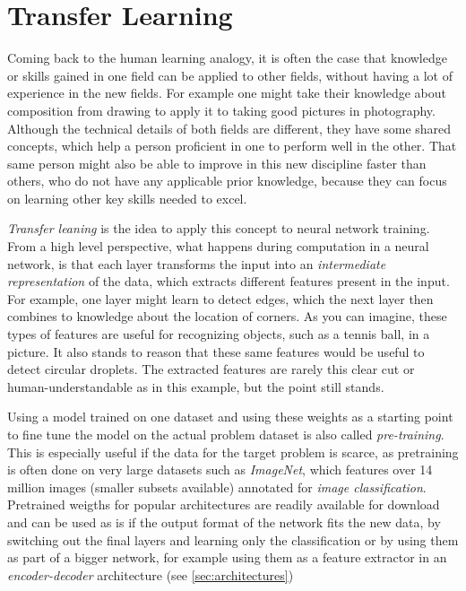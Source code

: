 \section{Transfer Learning}
\label{sec:transfer_learning}

Coming back to the human learning analogy, it is often the case that knowledge or skills gained in one field can be applied to other fields, without having a lot of experience in the new fields. For example one might take their knowledge about composition from drawing to apply it to taking good pictures in photography. Although the technical details of both fields are different, they have some shared concepts, which help a person proficient in one to perform well in the other. That same person might also be able to improve in this new discipline faster than others, who do not have any applicable prior knowledge, because they can focus on learning other key skills needed to excel.

\emph{Transfer leaning} is the idea to apply this concept to neural network training. From a high level perspective, what happens during computation in a neural network, is that each layer transforms the input into an \emph{intermediate representation} of the data, which extracts different features present in the input. For example, one layer might learn to detect edges, which the next layer then combines to knowledge about the location of corners. As you can imagine, these types of features are useful for recognizing objects, such as a tennis ball, in a picture. It also stands to reason that these same features would be useful to detect circular droplets. The extracted features are rarely this clear cut or human-understandable as in this example, but the point still stands. 

Using a model trained on one dataset and using these weights as a starting point to fine tune the model on the actual problem dataset is also called \emph{pre-training}. This is especially useful if the data for the target problem is scarce, as pretraining is often done on very large datasets such as \emph{ImageNet}, which features over 14 million images (smaller subsets available) annotated for \emph{image classification}. Pretrained weigths for popular architectures are readily available for download and can be used as is if the output format of the network fits the new data, by switching out the final layers and learning only the classification or by using them as part of a bigger network, for example using them as a feature extractor in an \emph{encoder-decoder} architecture (see \ref{sec:architectures})

